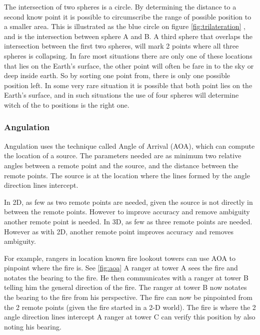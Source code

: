   The intersection of two spheres is a circle. By determining the distance to a second know point it is possible to circumscribe the range of possible position to a smaller area.
  This is illustrated as the blue circle on figure \ref{fig:trilateration} , and is the intersection between sphere A and B.
  A third sphere that overlaps the intersection between the first two spheres, will mark 2 points where all three spheres is collapsing. In fare most situations there are only one of these locations that lies on the Earth's surface, the other point will often be fare in to the sky or deep inside earth. So by sorting one point from, there is only one possible position left. 
  In some very rare situation it is possible that both point lies on the Earth's surface, and in such situations the use of four spheres will determine witch of the to positions is the right one.



  \subsubsection{Angulation}

  Angulation uses the technique called Angle of Arrival (AOA), which can compute the location of a source. The parameters needed are as minimum two relative angles between a remote point and the source, and the distance between the remote points. The source is at the location where the lines formed by the angle direction lines intercept. 

  In 2D, as few as two remote points are needed, given the source is not directly in between the remote points. However to improve accuracy and remove ambiguity  another remote point is needed. In 3D, as few as three remote points are needed. However as with 2D, another remote point improves accuracy and removes ambiguity. \cite{Liu2007, Sun2009, Boontrai2009}

  For example, rangers in location known fire lookout towers can use AOA to pinpoint where the fire is. See \cref{fig:aoa} A ranger at tower A sees the fire and notates the bearing to the fire. He then communicates with a ranger at tower B telling him the general direction of the fire. The ranger at tower B now notates the bearing to the fire from his perspective. The fire can now be pinpointed from the 2 remote points (given the fire started in a 2-D world). The fire is where the 2 angle direction lines intercept A ranger at tower C can verify this position by also noting his bearing. \cite{compassdude_triangulation}

